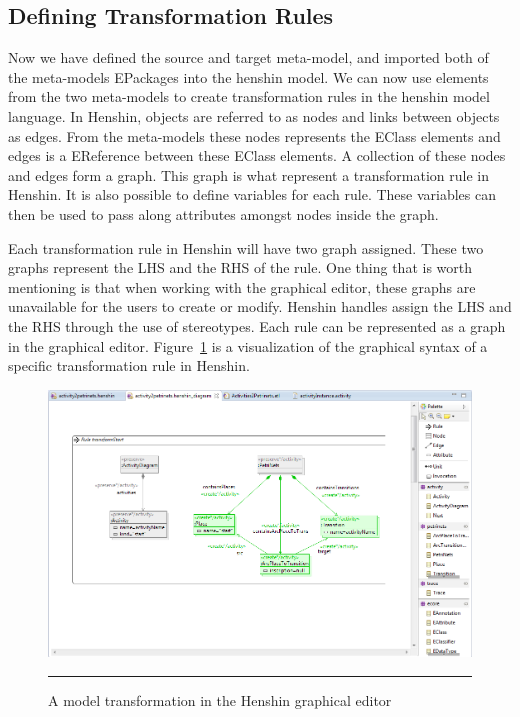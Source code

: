 \subsection{Defining Transformation Rules}

Now we have defined the source and target meta-model, and imported
both of the meta-models EPackages into the henshin model. We can now use elements
from the two meta-models to create transformation rules in the henshin model
language. In Henshin, objects are referred to as nodes and links between objects
as edges. From the meta-models these nodes represents the EClass elements and
edges is a EReference between these EClass elements. A collection of these nodes
and edges form a graph. This graph is what represent a transformation rule in
Henshin. It is also possible to define variables for each rule. These variables
can then be used to pass along attributes amongst nodes inside the
graph. 

Each transformation rule in Henshin will have two graph assigned.
These two graphs represent the LHS and the RHS of the rule. One thing that is worth mentioning is
that when working with the graphical editor, these graphs are unavailable for
the users to create or modify. Henshin handles assign the LHS and the RHS
through the use of stereotypes. Each rule can be represented as a graph in the
graphical editor. Figure~\ref{fig:HenshinScreen} is a visualization of the
graphical syntax of a specific transformation rule in Henshin.

\begin{figure}[H]
	\centering
	\includegraphics[scale=0.5]{figures/Henshin_Screen.png}
	\rule{35em}{0.5pt}
	\caption[The Henshin graphical editor]
	{A model transformation in the Henshin graphical editor}
	\label{fig:HenshinScreen}
\end{figure}

